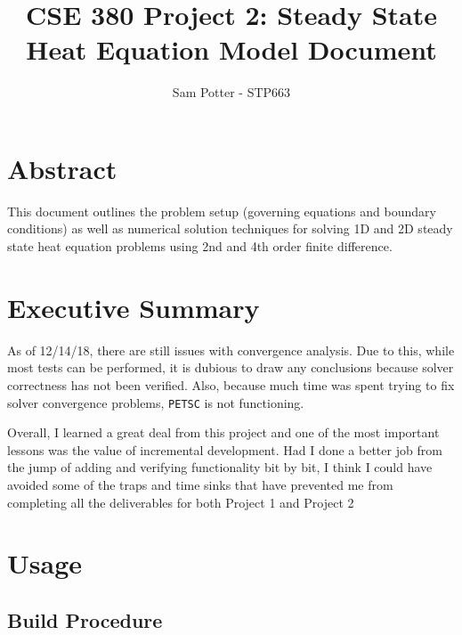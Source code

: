 \documentclass[letterpaper,12pt]{article}
\title{CSE 380 Project 2: Steady State Heat Equation Model Document}
\author{Sam Potter - STP663}
\begin{document}
\maketitle

\tableofcontents

\section{Abstract}
This document outlines the problem setup (governing equations and boundary conditions) as well as numerical solution techniques for solving 1D and 2D steady state heat equation problems using 2nd and 4th order finite difference.

\section{Executive Summary}
As of 12/14/18, there are still issues with convergence analysis. Due to this, while most tests can be performed, it is dubious to draw any conclusions because solver correctness has not been verified. Also, because much time was spent trying to fix solver convergence problems, \verb|PETSC| is not functioning.

Overall, I learned a great deal from this project and one of the most important lessons was the value of incremental development. Had I done a better job from the jump of adding and verifying functionality bit by bit, I think I could have avoided some of the traps and time sinks that have prevented me from completing all the deliverables for both Project 1 and Project 2

\section{Usage}
\subsection{Build Procedure}
\end{document}
